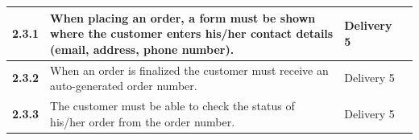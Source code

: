 \documentclass[a4paper,12pt]{article}
\begin{document}
\begin{table}[htbp]
\begin{tabular}{|l|L{8cm}|L{2.5cm}|L{2.5cm}|}
		\textbf{2.3.1} & When placing an order, a form must be shown where the customer enters his/her contact details (email, address, phone number).                      &    Delivery 5      &        \\ \hline
		\textbf{2.3.2} & When an order is finalized the customer must receive an auto-generated order number.                                                                                                          &  Delivery 5        &        \\ \hline
		\textbf{2.3.3} & The customer must be able to check the status of his/her order from the order number.                                                                                                         &   Delivery 5       &        \\ \hline
	\end{tabular}
\end{table}

\newpage
\end{document}
